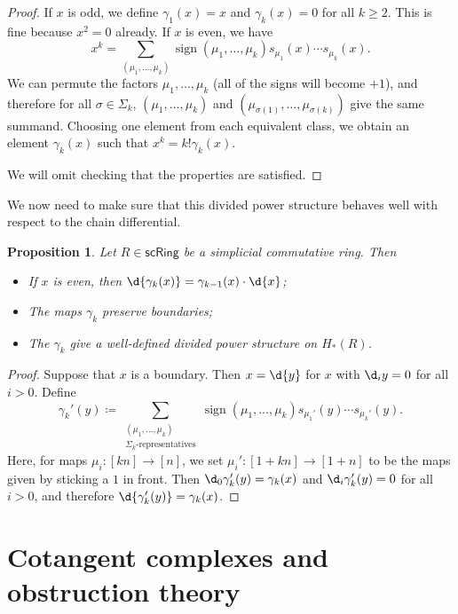 \documentclass[10pt]{amsart}
\newtheorem{prop}[thm]{Proposition}
\theoremstyle{definition}
\theoremstyle{remark}
\theoremstyle{plain}
\theoremstyle{definition}
\theoremstyle{remark}
\newcommand{\on}[1]{\operatorname{#1}}
\newcommand{\ms}[1]{\mathsf{#1}}
\newcommand{\1}{\mathbf{1}}
\newcommand{\2}{\mathbf{2}}
\newcommand{\3}{\mathbf{3}}
\begin{document}
\begin{proof}
    If $x$ is odd, we define $\gamma_1(x) = x$ and $\gamma_k(x) = 0$ for all $k \geq 2$. This is fine because $x^2 = 0$ already. If $x$ is even, we have
    \[ x^k = \sum_{(\mu_1, \ldots, \mu_k)} \on{sign}(\mu_1, \ldots, \mu_k) s_{\mu_1}(x) \cdots s_{\mu_k}(x). \]
    We can permute the factors $\mu_1, \ldots, \mu_k$ (all of the signs will become $+1$), and therefore for all $\sigma \in \Sigma_k$, $(\mu_1, \ldots, \mu_k)$ and $(\mu_{\sigma(1)}, \ldots, \mu_{\sigma(k)})$ give the same summand. Choosing one element from each equivalent class, we obtain an element $\gamma_k(x)$ such that $x^k = k! \gamma_k(x)$.

    We will omit checking that the properties are satisfied.
\end{proof}

We now need to make sure that this divided power structure behaves well with respect to the chain differential.
\begin{prop}
    Let $R \in \ms{scRing}$ be a simplicial commutative ring. Then
    \begin{itemize}
        \item If $x$ is even, then $\d{\gamma_k(x)} = \gamma_{k-1}(x)\cdot \d{x}$;
        \item The maps $\gamma_k$ preserve boundaries;
        \item The $\gamma_k$ give a well-defined divided power structure on $H_*(R)$.
    \end{itemize}
\end{prop}

\begin{proof}
    Suppose that $x$ is a boundary. Then $x = \d{y}$ for $x$ with $\d_i y = 0$ for all $i > 0$. Define
    \[
        \gamma_k'(y) \coloneqq \sum_{\substack{(\mu_1, \ldots, \mu_k) \\ \Sigma_k \text{-representatives}}} \on{sign}(\mu_1, \ldots, \mu_k) s_{\mu_1'}(y) \cdots s_{\mu_k'}(y).
    \]
    Here, for maps $\mu_i \colon [kn] \to [n]$, we set $\mu_i' \colon [1+kn] \to [1+n]$ to be the maps given by sticking a $1$ in front. Then $\d_0 \gamma_k'(y) = \gamma_k(x)$ and $\d_i \gamma_k'(y) = 0$ for all $i > 0$, and therefore $\d{\gamma_k'(y)} = \gamma_k(x)$.
\end{proof}

\section{Cotangent complexes and obstruction theory}%
\label{sec:Cotangent complexes}
\end{document}
